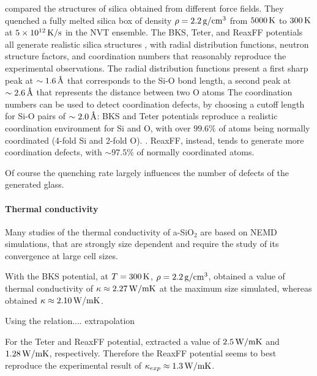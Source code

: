 \citet{Tian2017} compared the structures of silica obtained from different force fields. They quenched a fully melted silica box of density $\rho=2.2\,\mathrm{g/cm^3}$ from $5000\,\mathrm{K}$ to $300\,\mathrm{K}$ at $5\times 10^{12}\,\mathrm{K/s}$ in the NVT ensemble. 
The BKS, Teter, and ReaxFF potentials all generate realistic silica structures \cite{Vollmayr1996,Yu2016,Yuan2001}, with radial distribution functions, neutron structure factors, and coordination numbers that reasonably reproduce the experimental observations.
The radial distribution functions present a first sharp peak at $\sim 1.6\,\mathrm{{\mbox{\AA}}}$ that corresponds to the Si-O bond length, a second peak at $\sim 2.6\,\mathrm{{\mbox{\AA}}}$ that represents the distance between two O atoms
The coordination numbers can be used to detect coordination defects, by choosing a cutoff length for Si-O pairs of $\sim 2.0\,\mathrm{{\mbox{\AA}}}$: BKS and Teter potentials reproduce a realistic coordination environment for Si and O, with over $99.6\%$ of atoms being normally coordinated (4-fold Si and 2-fold O). . ReaxFF, instead, tends to generate more coordination defects, with $\sim 97.5\%$ of normally coordinated atoms.

Of course the quenching rate largely influences the number of defects of the generated glass. 

\paragraph{Thermal conductivity}
Many studies of the thermal conductivity of a-SiO$_2$ are based on NEMD simulations, that are strongly size dependent and require the study of its convergence at large cell sizes.

With the BKS potential, at $T=300\,\mathrm{K}$, $\rho=2.2\,\mathrm{g/cm^3}$, \citet{Tian2017} obtained a value of thermal conductivity of $\kappa\approx 2.27\,\mathrm{W/mK}$ at the maximum size simulated, whereas \citet{Coquil2011} obtained $\kappa\approx 2.10\,\mathrm{W/mK}$. 

Using the relation.... extrapolation

For the Teter and ReaxFF potential, \citet{Tian2017} extracted a value of $2.5\,\mathrm{W/mK}$ and $1.28\,\mathrm{W/mK}$, respectively. Therefore the ReaxFF potential seems to best reproduce the experimental result of $\kappa_{exp}\approx 1.3\,\mathrm{W/mK}$.


